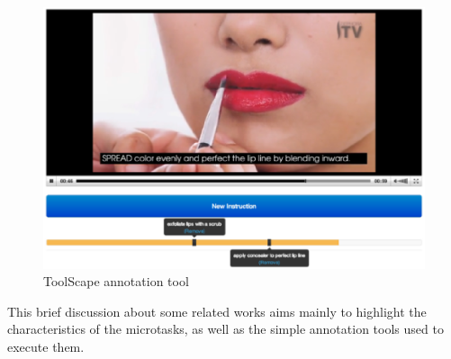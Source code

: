 \begin{figure}[h]
	\centerline{\includegraphics[scale=0.23] {figure/related_2_a}}
	\caption{ToolScape annotation tool\cite{Kim:2014:JSL:2679600.2680027}}
	\label{related_2_a}
\end{figure} 

This brief discussion about some related works aims mainly to highlight the characteristics of the microtasks, as well as the simple annotation tools used to execute them.